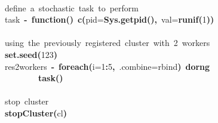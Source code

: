 \documentclass[a4paper,12pt]{article}\usepackage{graphicx, color}
\makeatletter
\newcommand{\hlnumber}[1]{\textcolor[rgb]{0,0,0}{#1}}%
\newcommand{\hlfunctioncall}[1]{\textcolor[rgb]{0.501960784313725,0,0.329411764705882}{\textbf{#1}}}%
\newcommand{\hlkeyword}[1]{\textcolor[rgb]{0,0,0}{\textbf{#1}}}%
\newcommand{\hlargument}[1]{\textcolor[rgb]{0.690196078431373,0.250980392156863,0.0196078431372549}{#1}}%
\newcommand{\hlcomment}[1]{\textcolor[rgb]{0.180392156862745,0.6,0.341176470588235}{#1}}%
\newcommand{\hlassignement}[1]{\textcolor[rgb]{0,0,0}{\textbf{#1}}}%
\newcommand{\hlsymbol}[1]{\textcolor[rgb]{0,0,0}{#1}}%
\newcommand{\hlstd}[1]{\textcolor[rgb]{0,0,0}{#1}}%
\newenvironment{kframe}{%
 \def\FrameCommand##1{\hskip\@totalleftmargin \hskip-\fboxsep
 \colorbox{shadecolor}{##1}\hskip-\fboxsep
     \hskip-\linewidth \hskip-\@totalleftmargin \hskip\columnwidth}%
 \MakeFramed {\advance\hsize-\width
   \@totalleftmargin\z@ \linewidth\hsize
   \@setminipage}}%
 {\par\unskip\endMakeFramed}
\newenvironment{knitrout}{}{} %
\renewenvironment{knitrout}{\begin{footnotesize}}{\end{footnotesize}}
\makeatother
\begin{document}
\begin{knitrout}
\color{fgcolor}\begin{kframe}
\begin{flushleft}
\ttfamily\noindent
\hspace*{\fill}\\
\hlstd{}\hlcomment{\usebox{\hlnormalsizeboxhash}{\ }define{\ }a{\ }stochastic{\ }task{\ }to{\ }perform}\hspace*{\fill}\\
\hlstd{}\hlsymbol{task}{\ }\hlassignement{\usebox{\hlnormalsizeboxlessthan}-}{\ }\hlkeyword{function}\hlkeyword{(}\hlkeyword{)}{\ }\hlfunctioncall{c}\hlkeyword{(}\hlargument{pid}\hlargument{=}\hlfunctioncall{Sys.getpid}\hlkeyword{(}\hlkeyword{)}\hlkeyword{,}{\ }\hlargument{val}\hlargument{=}\hlfunctioncall{runif}\hlkeyword{(}\hlnumber{1}\hlkeyword{)}\hlkeyword{)}\hspace*{\fill}\\
\hlstd{}\hspace*{\fill}\\
\hlstd{}\hlcomment{\usebox{\hlnormalsizeboxhash}{\ }using{\ }the{\ }previously{\ }registered{\ }cluster{\ }with{\ }2{\ }workers}\hspace*{\fill}\\
\hlstd{}\hlfunctioncall{set.seed}\hlkeyword{(}\hlnumber{123}\hlkeyword{)}\hspace*{\fill}\\
\hlstd{}\hlsymbol{res\usebox{\hlnormalsizeboxunderscore}2workers}{\ }\hlassignement{\usebox{\hlnormalsizeboxlessthan}-}{\ }\hlfunctioncall{foreach}\hlkeyword{(}\hlargument{i}\hlargument{=}\hlnumber{1}\hlkeyword{:}\hlnumber{5}\hlkeyword{,}{\ }\hlargument{.combine}\hlargument{=}\hlsymbol{rbind}\hlkeyword{)}{\ }\hlkeyword{\usebox{\hlnormalsizeboxpercent}dorng\usebox{\hlnormalsizeboxpercent}}{\ }\hlkeyword{\usebox{\hlnormalsizeboxopenbrace}}\hspace*{\fill}\\
\hlstd{}{\ }{\ }{\ }{\ }{\ }{\ }{\ }{\ }\hlfunctioncall{task}\hlkeyword{(}\hlkeyword{)}\hspace*{\fill}\\
\hlstd{}\hlkeyword{\usebox{\hlnormalsizeboxclosebrace}}\hspace*{\fill}\\
\hlstd{}\hlcomment{\usebox{\hlnormalsizeboxhash}{\ }stop{\ }cluster}\hspace*{\fill}\\
\hlstd{}\hlfunctioncall{stopCluster}\hlkeyword{(}\hlsymbol{cl}\hlkeyword{)}\hspace*{\fill}\\

\end{flushleft}
\end{kframe}
\end{knitrout}
\end{document}
